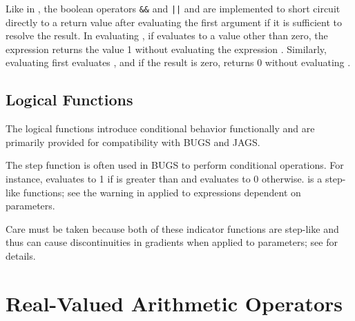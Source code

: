 Like in \Cpp, the boolean operators \Verb/&&/ and \Verb/||/ and are
implemented to short circuit directly to a return value after
evaluating the first argument if it is sufficient to resolve the
result.  In evaluating , if  evaluates to a value
other than zero, the expression returns the value 1 without evaluating
the expression .  Similarly, evaluating  first
evaluates , and if the result is zero, returns 0 without
evaluating .


\subsection{Logical Functions}

The logical functions introduce conditional behavior functionally and
are primarily provided for compatibility with BUGS and JAGS.
%
\begin{description}
\end{description}
%
The step function is often used in BUGS to perform conditional
operations.  For instance,  evaluates to 1 if
 is greater than  and evaluates to 0 otherwise.
 is a step-like functions; see the warning in
 applied to expressions dependent on
parameters. 


\begin{description}
\end{description}
%
\begin{description}
\end{description}
%
Care must be taken because both of these indicator functions are
step-like and thus can cause discontinuities in gradients when applied
to parameters; see  for details.

\section{Real-Valued Arithmetic Operators}\label{real-valued-arithmetic-operators.section}

